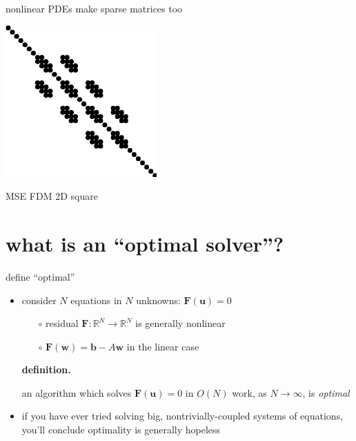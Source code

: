 \documentclass[hide notes,intlimits,usenames,dvipsnames]{beamer}
\newcommand{\RR}{\mathbb{R}}
\begin{document}
\begin{frame}{nonlinear PDEs make sparse matrices too}
\begin{itemize}
\begin{minipage}[t]{20mm}
\includegraphics[width=\textwidth]{figs/spybanded}

\tiny
 MSE FDM 2D square
\end{minipage}
\end{itemize}
\end{frame}


\section{what is an ``optimal solver''?}

\begin{frame}{define ``optimal''}
\begin{itemize}
\item consider $N$ equations in $N$ unknowns: \qquad $\mathbf{F}(\mathbf{u}) = 0$
	\begin{itemize}
	\item[$\circ$] residual $\mathbf{F}:\RR^N \to \RR^N$ is generally nonlinear
	\item[$\circ$] $\mathbf{F}(\mathbf{w}) = \mathbf{b} - A \mathbf{w}$ in the linear case
	\end{itemize}

\bigskip\medskip
\noindent \textbf{definition.}  \begin{minipage}[t]{80mm}
an algorithm which solves $\mathbf{F}(\mathbf{u}) = 0$ in $O(N)$ work, as $N\to\infty$, is \alert{\emph{optimal}}
\end{minipage}

\bigskip \bigskip
\item if you have ever tried solving big, nontrivially-coupled systems of equations, you'll conclude optimality is generally hopeless
\end{itemize}
\end{frame}
\end{document}
